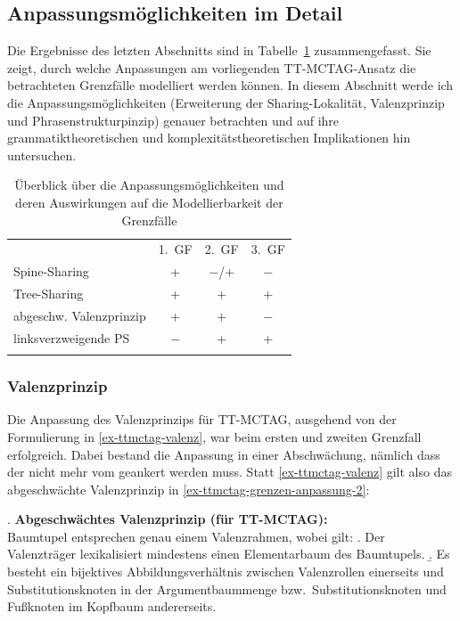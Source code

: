 \subsection{Anpassungsmöglichkeiten im Detail} \label{sec-ttmctag-grenzen-anpassung}

Die Ergebnisse des letzten Abschnitts sind in Tabelle~\ref{tab-ttmctag-grenzen-anpassung-1} zusammengefasst. Sie zeigt, durch welche Anpassungen am vorliegenden TT-MCTAG-Ansatz die betrachteten Grenzfälle modelliert werden können. In diesem Abschnitt werde ich die Anpassungsmöglichkeiten (Erweiterung der Sharing-Lokalität, Valenzprinzip und Phrasenstrukturpinzip) genauer betrachten und auf ihre grammatiktheoretischen und komplexitätstheoretischen Implikationen hin untersuchen. 

\begin{table}[ht]
\centering
\begin{tabular}{lccc}
\lsptoprule
 & 1.~GF & 2.~GF & 3.~GF \\
\cmidrule{2-4}
Spine-Sharing & + & $-$/+ & $-$ \\ 
Tree-Sharing & + & + & + \\
abgeschw. Valenzprinzip & + & + & $-$ \\
linksverzweigende PS & $-$ & + & + \\
\lspbottomrule
\end{tabular}
\caption{\label{tab-ttmctag-grenzen-anpassung-1}Überblick über die Anpassungsmöglichkeiten und deren Auswirkungen auf die Modellierbarkeit der Grenzfälle}
\end{table}



\subsubsection{Valenzprinzip}

Die Anpassung des Valenzprinzips für TT-MCTAG, ausgehend von der Formulierung in \ref{ex-ttmctag-valenz}, war beim ersten und zweiten Grenzfall erfolgreich. Dabei bestand die Anpassung in einer Abschwächung, nämlich dass der  nicht mehr vom  geankert werden muss. Statt \ref{ex-ttmctag-valenz} gilt also das ab\-ge\-schwäch\-te Valenzprinzip in \ref{ex-ttmctag-grenzen-anpassung-2}:

\ex. {\bf Abgeschwächtes Valenzprinzip (für TT-MCTAG):}\label{ex-ttmctag-grenzen-anpassung-2}\\
Baumtupel entsprechen genau einem Valenzrahmen, wobei gilt:
\a. Der Valenzträger lexikalisiert mindestens einen Elementarbaum des Baumtupels.
\b. Es besteht ein bijektives Abbildungsverhältnis zwischen Valenzrollen einerseits und Substitutionsknoten in der Argumentbaummenge bzw.\ Substitutionsknoten und Fu\ss knoten im Kopfbaum andererseits.


